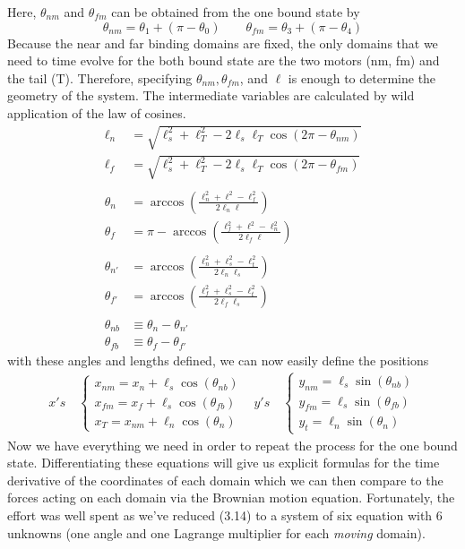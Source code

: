 		Here, $\theta_{nm}$ and $\theta_{fm}$ can be obtained from the one bound state by 
		\begin{equation}
			\theta_{nm} = \theta_1+(\pi-\theta_0) \qquad \theta_{fm}= \theta_3 + (\pi-\theta_4) 
		\end{equation}
		Because the near and far binding domains are fixed, the only domains that we need to time evolve for the both bound state are the two motors (nm, fm) and the tail (T). Therefore, specifying $\theta_{nm}, \theta_{fm}$, and $\ell$ is enough to determine the geometry of the system. The intermediate variables are calculated by wild application of the law of cosines. 
		\begin{align}
			\ell_n &= \sqrt{\ell_s^2+\ell_T^2-2\ell_s\ell_T\cos(2\pi-\theta_{nm})} \\
			\ell_f &=  \sqrt{\ell_s^2+\ell_T^2-2\ell_s\ell_T\cos(2\pi-\theta_{fm})} \\
			\text{}\nonumber\\
			 \theta_n &= \arccos\left(\frac{\ell_n^2+\ell^2-\ell_f^2}{2\ell_n\ell}\right)\\
			\theta_f &= \pi-\arccos\left(\frac{\ell_f^2+\ell^2-\ell_n^2}{2\ell_f\ell}\right)\\
			\text{}\nonumber\\
			\theta_{n'} &= \arccos\left(\frac{\ell_n^2+\ell_s^2-\ell_t^2}{2\ell_n\ell_s}\right) \\
			\theta_{f'} &= \arccos\left(\frac{\ell_f^2+\ell_s^2-\ell_t^2}{2\ell_f\ell_s}\right) \\ 
			\text{}\nonumber \\ 
			\theta_{nb} &\equiv \theta_{n}-\theta_{n'} \\ 
			\theta_{fb} &\equiv \theta_{f}-\theta_{f'} 
		\end{align}
	   	with these angles and lengths defined, we can now easily define the positions 
	   		\begin{align}
	   	{x}'s \quad \begin{cases}
	   	{x}_{nm} = x_n+\ell_s\cos(\theta_{nb}) \\
	   	{x}_{fm} = x_f+\ell_s\cos(\theta_{fb}) \\
	   	{x}_{T} = x_{nm}+\ell_n\cos(\theta_n) 
	   	\end{cases} &
	   	{y}'s \quad \begin{cases}
	   	{y}_{nm} = \ell_s\sin(\theta_{nb}) \\
	   	{y}_{fm} = \ell_s\sin(\theta_{fb}) \\
	   	{y}_{t} = \ell_n\sin(\theta_n) 
	   	\end{cases} 
	   	\end{align}
		Now we have everything we need in order to repeat the process for the one bound state. Differentiating these equations will give us explicit formulas for the time derivative of the coordinates of each domain which we can then compare to the forces acting on each domain via the Brownian motion equation. Fortunately, the effort was well spent as we've reduced (3.14) to a system of six equation with 6 unknowns (one angle and one Lagrange multiplier for each \textit{moving} domain). 
		 
